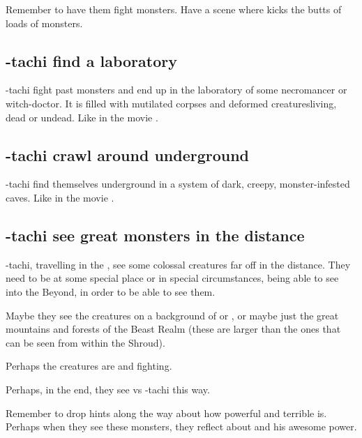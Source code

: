 Remember to have them fight monsters. Have a scene where \Dzasselid{} kicks the butts of loads of monsters. 







\subsection{\Shilred-tachi find a laboratory}
\Shilred-tachi fight past monsters and end up in the laboratory of some necromancer or witch-doctor. It is filled with mutilated corpses and deformed creatures\dash living, dead or undead. Like in the movie \cite{Movie:HouseoftheDead}. 







\subsection{\Shilred-tachi crawl around underground}
\Shilred-tachi find themselves underground in a system of dark, creepy, monster-infested caves. Like in the movie \cite{Movie:HouseoftheDead}. 








\subsection{\Shilred{}-tachi see great monsters in the distance}
\Shilred-tachi, travelling in the \Wylde{}, see some colossal creatures far off in the distance. They need to be at some special place or in special circumstances, being able to see into the Beyond, in order to be able to see them. 

Maybe they see the creatures on a background of \Nyx{} or \Machai{}, or maybe just the great mountains and forests of the Beast Realm (these are larger than the ones that can be seen from within the Shroud). 

Perhaps the creatures are \dragons{} and \banes{} fighting. 

Perhaps, in the end, they see \Ishnaruchaefir{} vs \Teshrial-tachi this way. 

Remember to drop hints along the way about how powerful and terrible \Ishnaruchaefir{} is. Perhaps when they see these monsters, they reflect about \Ishnaruchaefir{} and his awesome power. 







